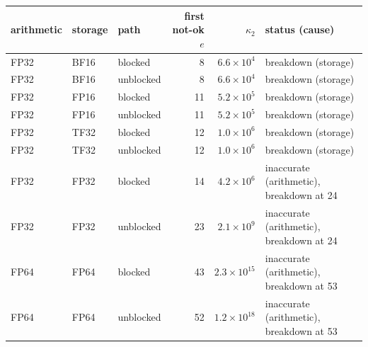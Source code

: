 \begin{tabular}{lllrrl}
\toprule
arithmetic & storage & path & first not-ok $e$ & $\kappa_2$ & status (cause)\\
\midrule
FP32 & BF16 & blocked & 8 & $6.6\!\times\!10^{4}$ & breakdown (storage)\\
FP32 & BF16 & unblocked & 8 & $6.6\!\times\!10^{4}$ & breakdown (storage)\\
FP32 & FP16 & blocked & 11 & $5.2\!\times\!10^{5}$ & breakdown (storage)\\
FP32 & FP16 & unblocked & 11 & $5.2\!\times\!10^{5}$ & breakdown (storage)\\
FP32 & TF32 & blocked & 12 & $1.0\!\times\!10^{6}$ & breakdown (storage)\\
FP32 & TF32 & unblocked & 12 & $1.0\!\times\!10^{6}$ & breakdown (storage)\\
FP32 & FP32 & blocked & 14 & $4.2\!\times\!10^{6}$ & inaccurate (arithmetic), breakdown at 24\\
FP32 & FP32 & unblocked & 23 & $2.1\!\times\!10^{9}$ & inaccurate (arithmetic), breakdown at 24\\
FP64 & FP64 & blocked & 43 & $2.3\!\times\!10^{15}$ & inaccurate (arithmetic), breakdown at 53\\
FP64 & FP64 & unblocked & 52 & $1.2\!\times\!10^{18}$ & inaccurate (arithmetic), breakdown at 53\\
\bottomrule
\end{tabular}
